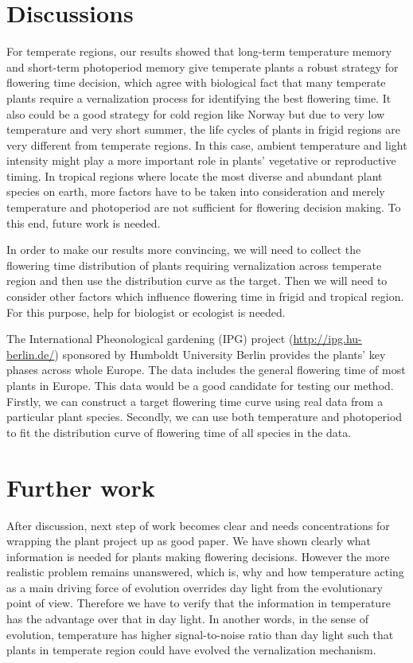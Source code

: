 \documentclass[paper=a4, fontsize=12pt]{scrartcl}	%
\numberwithin{equation}{section}					%
\numberwithin{figure}{section}					%
\numberwithin{table}{section}					%
\begin{document}
\section{Discussions}
For temperate regions, our results showed that long-term temperature memory and short-term photoperiod memory give temperate plants a robust strategy for flowering time decision, which agree with biological fact that many temperate plants require a vernalization process for identifying the best flowering time. It also could be a good strategy for cold region like Norway but due to very low temperature and very short summer, the life cycles of plants in frigid regions are very different from temperate regions. In this case, ambient temperature and light intensity might play a more important role in plants' vegetative or reproductive timing. In tropical regions where locate the most diverse and abundant plant species on earth, more factors have to be taken into consideration and merely temperature and photoperiod are not sufficient for flowering decision making. To this end, future work is needed.  

In order to make our results more convincing, we will need to collect the flowering time distribution of plants requiring vernalization across temperate region and then use the distribution curve as the target. Then we will need to consider other factors which influence flowering time in frigid and tropical region. For this purpose, help for biologist or ecologist is needed. 

The International Pheonological gardening (IPG) project (\url{http://ipg.hu-berlin.de/}) sponsored by Humboldt University Berlin provides the plants' key phases across whole Europe. The data includes the general flowering time of most plants in Europe. This data would be a good candidate for testing our method. Firstly, we can construct a target flowering time curve using real data from a particular plant species. Secondly, we can use both temperature and photoperiod to fit the distribution curve of flowering time of all species in the data. 

\section{Further work}

After discussion, next step of work becomes clear and needs concentrations for wrapping the plant project up as good paper. We have shown clearly what information is needed for plants making flowering decisions. However the more realistic problem remains unanswered, which is, why and how temperature acting as a main driving force of evolution overrides day light from the evolutionary point of view. Therefore we have to verify that the information in temperature has the advantage over that in day light. In another words, in the sense of evolution, temperature has higher signal-to-noise ratio than day light such that plants in temperate region could have evolved the vernalization mechanism. 
\end{document}
